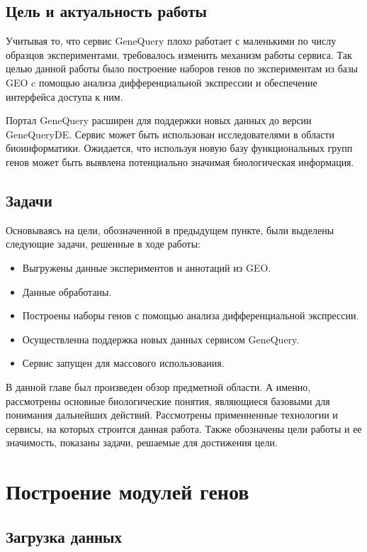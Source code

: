 \documentclass[times,specification,annotation]{itmo-student-thesis}
\begin{document}
\section{Цель и актуальность работы}

Учитывая то, что сервис GeneQuery плохо работает с маленькими по числу образцов экспериментами, требовалось изменить механизм работы сервиса. Так целью данной работы было построение наборов генов по экспериментам из базы GEO c помощью анализа дифференциальной экспрессии и обеспечение интерфейса доступа к ним. 

Портал GeneQuery расширен для поддержки новых данных до версии GeneQueryDE. Сервис может быть использован исследователями в области биоинформатики. Ожидается, что используя новую базу функциональных групп генов может быть выявлена потенциально значимая биологическая информация. 

\section{Задачи}

Основываясь на цели, обозначенной в предыдущем пункте, были выделены следующие задачи, решенные в ходе работы:
\begin{itemize}
    \item Выгружены данные экспериментов и аннотаций из GEO.
    \item Данные обработаны.
    \item Построены наборы генов с помощью анализа дифференциальной экспрессии.
    \item Осуществленна поддержка новых данных сервисом GeneQuery.
    \item Сервис запущен для массового использования.
\end{itemize}

\chapterconclusion

В данной главе был произведен обзор предметной области. А именно, рассмотрены основные биологические понятия, являющиеся базовыми для понимания дальнейших действий. Рассмотрены применненные технологии и сервисы, на которых строится данная работа. Также обозначены цели работы и ее значимость, показаны задачи, решаемые для достижения цели. 
\finishrelatedwork

\chapter{Построение модулей генов}

\section{Загрузка данных}
\end{document}
